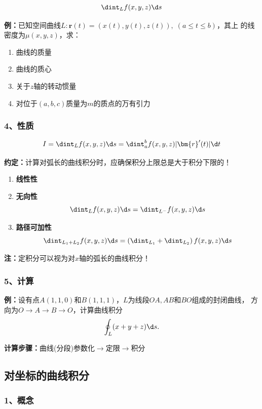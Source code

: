 $$\dint_Lf(x,y,z)\d s$$

{\bf 例：}已知空间曲线$L:\bm{r}(t)=(x(t),y(t),z(t)),\;(a\leq t\leq b)$，其上
的线密度为$\mu(x,y,z)$，求：
\begin{enumerate}
  \item 曲线的质量
  \item 曲线的质心
  \item 关于$z$轴的转动惯量
  \item 对位于$(a,b,c)$质量为$m$的质点的万有引力
\end{enumerate}

\subsubsection{4、性质}

$${I=\dint_Lf(x,y,z)\d s=\dint_a^bf(x,y,z)|\bm{r}'(t)|\d t}$$

{\bf 约定：}计算对弧长的曲线积分时，应确保积分上限总是大于积分下限的！

\begin{enumerate}[(1)]
  \setlength{\itemindent}{1cm}
  \item {\bf 线性性} 
  \item {\bf 无向性}
  $$\dint_Lf(x,y,z)\d s=\dint_{L^-}f(x,y,z)\d s$$
  \item {\bf 路径可加性}
  $$\dint_{L_1+L_2}f(x,y,z)\d s=\left(\dint_{L_1}+\dint_{
  L_2}\right)f(x,y,z)\d s$$
\end{enumerate}

{\bf 注：}定积分可以视为对$x$轴的弧长的曲线积分！

\subsubsection{5、计算}

{\bf 例：}设有点$A(1,1,0)$和$B(1,1,1)$，$L$为线段$OA,AB$和$BO$组成的封闭曲线，
方向为$O\to A\to B\to O$，计算曲线积分
$$\oint_L(x+y+z)\d s.$$

{\bf 计算步骤：}曲线(分段)参数化$\to$定限$\to$积分

\subsection{对坐标的曲线积分}

\subsubsection{1、概念}

